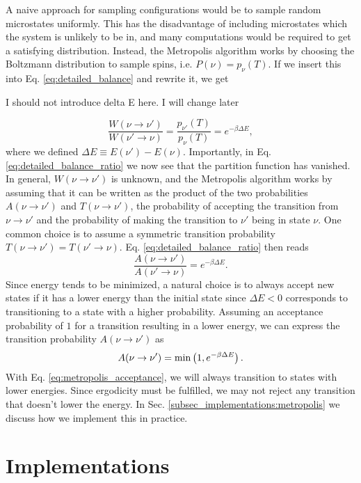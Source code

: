 A naive approach for sampling configurations would be to sample random microstates uniformly. This has the disadvantage of including microstates which the system is unlikely to be in, and many computations would be required to get a satisfying distribution. Instead, the Metropolis algorithm works by choosing the Boltzmann distribution to sample spins, i.e. $P(\nu)=p_\nu(T)$. If we insert this into Eq. \eqref{eq:detailed_balance} and rewrite it, we get 

\alert{I should not introduce delta E here. I will change later}

\begin{equation}\label{eq:detailed_balance_ratio}
    \frac{W(\nu\to \nu')}{W(\nu'\to \nu)} = \frac{p_{\nu'}(T)}{p_\nu(T)} = e^{-\beta \Delta E},
\end{equation}
where we defined $\Delta E \equiv E(\nu')-E(\nu)$. Importantly, in Eq. \eqref{eq:detailed_balance_ratio} we now see that the partition function has vanished. In general, $W(\nu\to\nu')$ is unknown, and the Metropolis algorithm works by assuming that it can be written as the product of the two probabilities $A(\nu\to\nu')$ and $T(\nu\to\nu')$, the probability of accepting the transition from $\nu\to\nu'$ and the probability of making the transition to $\nu'$ being in state $\nu$. One common choice is to assume a symmetric transition probability $T(\nu\to\nu')=T(\nu'\to\nu)$. Eq. \eqref{eq:detailed_balance_ratio} then reads 
\begin{equation}\label{eq:acceptance_rate}
    \frac{A(\nu\to\nu')}{A(\nu'\to\nu)}=e^{-\beta \Delta E}. 
\end{equation}
Since energy tends to be minimized, a natural choice is to always accept new states if it has a lower energy than the initial state since $\Delta E<0$ corresponds to transitioning to a state with a higher probability. Assuming an acceptance probability of $1$ for a transition resulting in a lower energy, we can express the transition probability $A(\nu\to\nu')$ as 
\begin{equation} \label{eq:metropolis_acceptance}
    A(\nu\to\nu') = \min\left( 1,e^{-\beta \Delta E} \right).
\end{equation}  
With Eq. \eqref{eq:metropolis_acceptance}, we will always transition to states with lower energies. Since ergodicity must be fulfilled, we may not reject any transition that doesn't lower the energy. In Sec. \ref{subsec_implementations:metropolis} we discuss how we implement this in practice.    


\section{Implementations}\label{sec:implementations}

